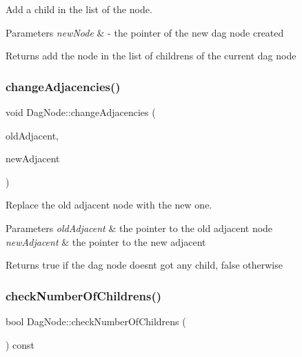 Add a child in the list of the node. 


\begin{DoxyParams}{Parameters}
{\em new\+Node} & -\/ the pointer of the new dag node created \\
\hline
\end{DoxyParams}
\begin{DoxyReturn}{Returns}
add the node in the list of childrens of the current dag node 
\end{DoxyReturn}
\mbox{\label{classDagNode_a5f70b777657539694e124557fcd35be1}} 
\subsubsection{\texorpdfstring{change\+Adjacencies()}{changeAdjacencies()}}
{\footnotesize\ttfamily void Dag\+Node\+::change\+Adjacencies (\begin{DoxyParamCaption}\item[{\hyperlink{classDagNode}{Dag\+Node} $\ast$}]{old\+Adjacent,  }\item[{\hyperlink{classDagNode}{Dag\+Node} $\ast$}]{new\+Adjacent }\end{DoxyParamCaption})\hspace{0.3cm}{\ttfamily [inline]}}



Replace the old adjacent node with the new one. 


\begin{DoxyParams}{Parameters}
{\em old\+Adjacent} & the pointer to the old adjacent node \\
\hline
{\em new\+Adjacent} & the pointer to the new adjacent \\
\hline
\end{DoxyParams}
\begin{DoxyReturn}{Returns}
true if the dag node doesn\textquotesingle{}t got any child, false otherwise 
\end{DoxyReturn}
\mbox{\label{classDagNode_af23fe9b192f5a629d3badf2c93475d2b}} 
\subsubsection{\texorpdfstring{check\+Number\+Of\+Childrens()}{checkNumberOfChildrens()}}
{\footnotesize\ttfamily bool Dag\+Node\+::check\+Number\+Of\+Childrens (\begin{DoxyParamCaption}{ }\end{DoxyParamCaption}) const\hspace{0.3cm}{\ttfamily [inline]}}



